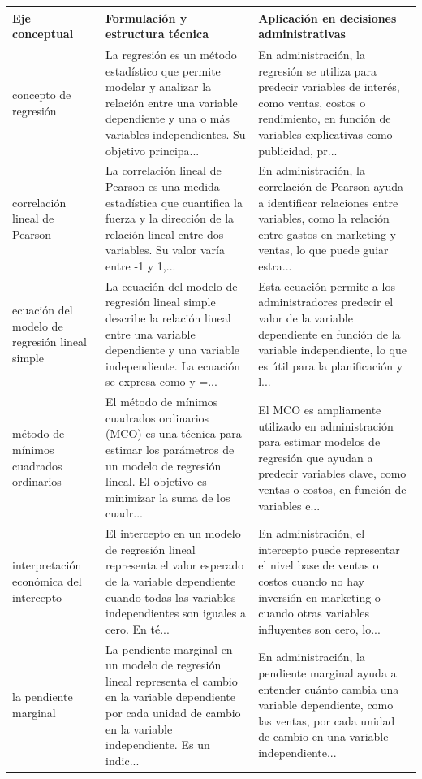 {\begin{center}
\renewcommand{\arraystretch}{1.25}
\begin{tabular}{p{3.6cm}p{5.2cm}p{5.8cm}}
\hline
\textbf{Eje conceptual} & \textbf{Formulación y estructura técnica} & \textbf{Aplicación en decisiones administrativas}\\\hline
concepto de regresión & La regresión es un método estadístico que permite modelar y analizar la relación entre una variable dependiente y una o más variables independientes. Su objetivo principa... & En administración, la regresión se utiliza para predecir variables de interés, como ventas, costos o rendimiento, en función de variables explicativas como publicidad, pr...\\\hline
correlación lineal de Pearson & La correlación lineal de Pearson es una medida estadística que cuantifica la fuerza y la dirección de la relación lineal entre dos variables. Su valor varía entre -1 y 1,... & En administración, la correlación de Pearson ayuda a identificar relaciones entre variables, como la relación entre gastos en marketing y ventas, lo que puede guiar estra...\\\hline
ecuación del modelo de regresión lineal simple & La ecuación del modelo de regresión lineal simple describe la relación lineal entre una variable dependiente y una variable independiente. La ecuación se expresa como y =... & Esta ecuación permite a los administradores predecir el valor de la variable dependiente en función de la variable independiente, lo que es útil para la planificación y l...\\\hline
método de mínimos cuadrados ordinarios & El método de mínimos cuadrados ordinarios (MCO) es una técnica para estimar los parámetros de un modelo de regresión lineal. El objetivo es minimizar la suma de los cuadr... & El MCO es ampliamente utilizado en administración para estimar modelos de regresión que ayudan a predecir variables clave, como ventas o costos, en función de variables e...\\\hline
interpretación económica del intercepto & El intercepto en un modelo de regresión lineal representa el valor esperado de la variable dependiente cuando todas las variables independientes son iguales a cero. En té... & En administración, el intercepto puede representar el nivel base de ventas o costos cuando no hay inversión en marketing o cuando otras variables influyentes son cero, lo...\\\hline
la pendiente marginal & La pendiente marginal en un modelo de regresión lineal representa el cambio en la variable dependiente por cada unidad de cambio en la variable independiente. Es un indic... & En administración, la pendiente marginal ayuda a entender cuánto cambia una variable dependiente, como las ventas, por cada unidad de cambio en una variable independiente...\\\hline
\end{tabular}
\end{center}


}
